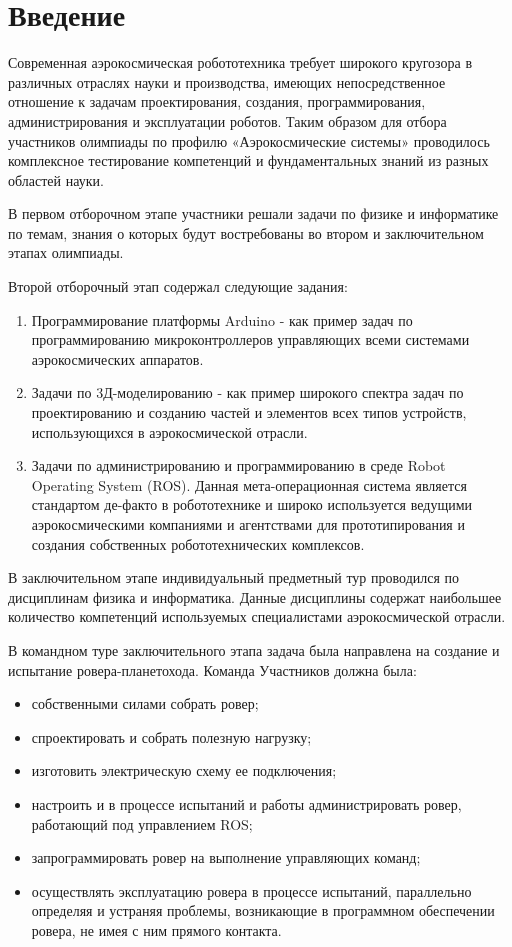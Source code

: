 

\section*{Введение}

Современная аэрокосмическая робототехника требует широкого кругозора в различных отраслях науки и производства, имеющих непосредственное отношение к задачам проектирования, создания, программирования, администрирования и эксплуатации роботов. Таким образом для отбора участников олимпиады по профилю «Аэрокосмические системы» проводилось комплексное тестирование компетенций и фундаментальных знаний из разных областей науки.

В первом отборочном этапе участники решали задачи по физике и информатике по темам, знания о которых будут востребованы во втором и заключительном этапах олимпиады.

Второй отборочный этап содержал следующие задания:
\begin{enumerate}
    \item Программирование платформы Arduino - как пример задач по программированию микроконтроллеров управляющих всеми системами аэрокосмических аппаратов.
    \item Задачи по 3Д-моделированию - как пример широкого спектра задач по проектированию и созданию частей и элементов всех типов устройств, использующихся в аэрокосмической отрасли.
    \item Задачи по администрированию и программированию в среде Robot Operating System (ROS). Данная мета-операционная система является стандартом де-факто в робототехнике и широко используется ведущими аэрокосмическими компаниями и агентствами для прототипирования и создания собственных робототехнических комплексов.
\end{enumerate}

В заключительном этапе индивидуальный предметный тур проводился по дисциплинам физика и информатика. Данные дисциплины содержат наибольшее количество компетенций используемых специалистами аэрокосмической отрасли.

В командном туре заключительного этапа задача была направлена на создание и испытание ровера-планетохода. Команда Участников должна была:
\begin{itemize}
    \item собственными силами собрать ровер;
    \item спроектировать и собрать полезную нагрузку;
    \item изготовить электрическую схему ее подключения;
    \item настроить и в процессе испытаний и работы администрировать ровер, работающий под управлением ROS;
    \item запрограммировать ровер на выполнение управляющих команд;
    \item осуществлять эксплуатацию ровера в процессе испытаний, параллельно определяя и устраняя проблемы, возникающие в программном обеспечении ровера, не имея с ним прямого контакта.
\end{itemize}

